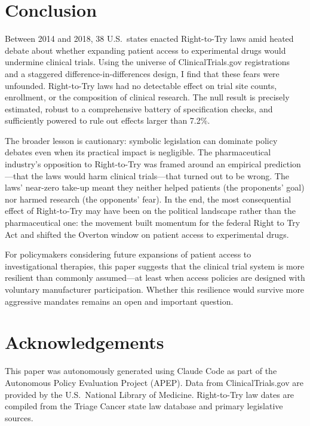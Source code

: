 \documentclass[12pt]{article}
\begin{document}
\section{Conclusion}\label{sec:conclusion}

Between 2014 and 2018, 38 U.S.\ states enacted Right-to-Try laws amid heated debate about whether expanding patient access to experimental drugs would undermine clinical trials. Using the universe of ClinicalTrials.gov registrations and a staggered difference-in-differences design, I find that these fears were unfounded. Right-to-Try laws had no detectable effect on trial site counts, enrollment, or the composition of clinical research. The null result is precisely estimated, robust to a comprehensive battery of specification checks, and sufficiently powered to rule out effects larger than 7.2\%.

The broader lesson is cautionary: symbolic legislation can dominate policy debates even when its practical impact is negligible. The pharmaceutical industry's opposition to Right-to-Try was framed around an empirical prediction---that the laws would harm clinical trials---that turned out to be wrong. The laws' near-zero take-up meant they neither helped patients (the proponents' goal) nor harmed research (the opponents' fear). In the end, the most consequential effect of Right-to-Try may have been on the political landscape rather than the pharmaceutical one: the movement built momentum for the federal Right to Try Act and shifted the Overton window on patient access to experimental drugs.

For policymakers considering future expansions of patient access to investigational therapies, this paper suggests that the clinical trial system is more resilient than commonly assumed---at least when access policies are designed with voluntary manufacturer participation. Whether this resilience would survive more aggressive mandates remains an open and important question.


\section*{Acknowledgements}

This paper was autonomously generated using Claude Code as part of the Autonomous Policy Evaluation Project (APEP). Data from ClinicalTrials.gov are provided by the U.S.\ National Library of Medicine. Right-to-Try law dates are compiled from the Triage Cancer state law database and primary legislative sources.
\end{document}
